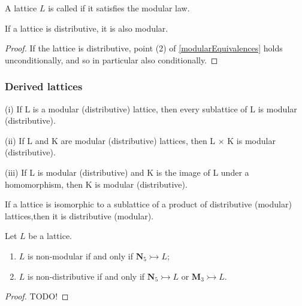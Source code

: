 \begin{definition}
A lattice $L$ is called  if it satisfies the modular law.
\end{definition}

\begin{lemma}
If a lattice is distributive, it is also modular.
\end{lemma}
\begin{proof}
If the lattice is distributive, point (2) of \ref{modularEquivalences} holds unconditionally, and so in particular also conditionally.
\end{proof}

\subsubsection{Derived lattices}

\begin{proposition}
(i) If L is a modular (distributive) lattice, then every sublattice of L
is modular (distributive).

(ii) If L and K are modular (distributive) lattices, then L × K is
modular (distributive).

(iii) If L is modular (distributive) and K is the image of L under a
homomorphism, then K is modular (distributive).
\end{proposition}
\begin{corollary}
If a lattice is isomorphic to a sublattice of a product
of distributive (modular) lattices,then it is distributive (modular).
\end{corollary}

\begin{theorem}
Let $L$ be a lattice.
\begin{enumerate}
\item $L$ is non-modular \textup{if and only if} $\mathbf{N}_5 \rightarrowtail L$;
\item $L$ is non-distributive \textup{if and only if} $\mathbf{N}_5 \rightarrowtail L$ or $\mathbf{M}_3 \rightarrowtail L$.
\end{enumerate}
\end{theorem}
\begin{proof}
TODO!
\end{proof}

